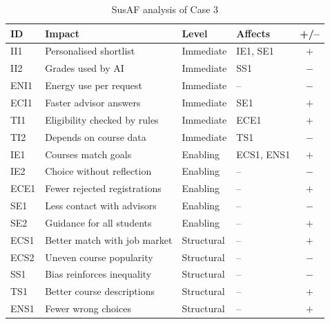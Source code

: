 \begin{table}[H]
    \centering
    \small
    \begin{tabularx}{\textwidth}{|l|X|l|l|c|}
        \hline
        \textbf{ID} & \textbf{Impact} & \textbf{Level} & \textbf{Affects} & \textbf{+/--} \\ \hline
        II1 & Personalised shortlist & Immediate & IE1, SE1 & $+$ \\ \hline
        II2 & Grades used by AI & Immediate & SS1 & $-$ \\ \hline
        ENI1 & Energy use per request & Immediate & -- & $-$ \\ \hline
        ECI1 & Faster advisor answers & Immediate & SE1 & $+$ \\ \hline
        TI1 & Eligibility checked by rules & Immediate & ECE1 & $+$ \\ \hline
        TI2 & Depends on course data & Immediate & TS1 & $-$ \\ \hline
        IE1 & Courses match goals & Enabling & ECS1, ENS1 & $+$ \\ \hline
        IE2 & Choice without reflection & Enabling & -- & $-$ \\ \hline
        ECE1 & Fewer rejected registrations & Enabling & -- & $+$ \\ \hline
        SE1 & Less contact with advisors & Enabling & -- & $-$ \\ \hline
        SE2 & Guidance for all students & Enabling & -- & $+$ \\ \hline
        ECS1 & Better match with job market & Structural & -- & $+$ \\ \hline
        ECS2 & Uneven course popularity & Structural & -- & $-$ \\ \hline
        SS1 & Bias reinforces inequality & Structural & -- & $-$ \\ \hline
        TS1 & Better course descriptions & Structural & -- & $+$ \\ \hline
        ENS1 & Fewer wrong choices & Structural & -- & $+$ \\ \hline
    \end{tabularx}
    \caption{SusAF analysis of Case 3}
    \label{tab:susaf-case3}
\end{table}

